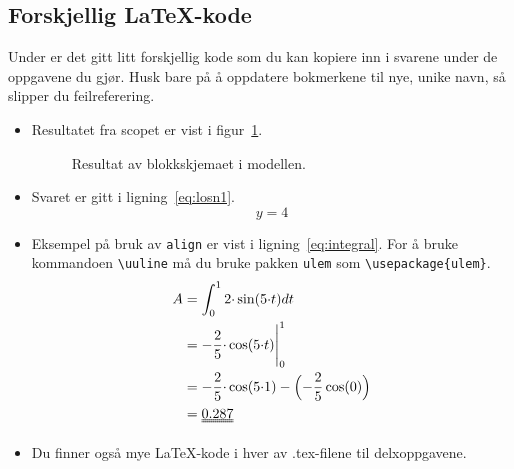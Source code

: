 \documentclass[answers,11pt]{exam}
\begin{document}
\begin{tcolorbox}
  \section*{Forskjellig {\LaTeX}-kode}
  Under er det gitt litt forskjellig kode som du kan kopiere inn i
svarene under de oppgavene du gjør. Husk bare på å oppdatere
bokmerkene til nye, unike navn, så slipper du feilreferering.

  \begin{itemize}
  \item    Resultatet fra scopet er vist i figur~\ref{fig:3a}. 
    
    \begin{figure}[H]
      \centering
      \hspace*{0mm}
      \caption{Resultat av blokkskjemaet i modellen. }
      \label{fig:3a}
    \end{figure}

  \item Svaret er gitt i ligning~\eqref{eq:losn1}.
    \begin{equation}
      \label{eq:losn1}
      y = 4
    \end{equation}

  \item Eksempel på bruk av {\tt align} er vist i
    ligning~\eqref{eq:integral}.
    For å bruke kommandoen {\tt \textbackslash uuline} må du bruke pakken
    {\tt ulem} som {\tt \textbackslash usepackage\{ulem\}}.
    \begin{align}
      A   & = \int_{0}^{1} 2{\cdot}\sin(5{\cdot}t) dt \notag \\ 
          & =    -\frac{2}{5}{\cdot}\cos(5{\cdot}t) \Biggl|_{0}^{1}  \notag \\
          &=-\frac{2}{5}{\cdot}\cos(5{\cdot} 1)
            -\Bigl(-\frac{2}{5}\cos(0)\Bigl) \notag\\
          &= \uuline{0.287} \label{eq:integral}
    \end{align}

  \item Du finner også mye \LaTeX-kode i hver av .tex-filene til delxoppgavene.
    
  \end{itemize}
\end{tcolorbox}
\end{document}
